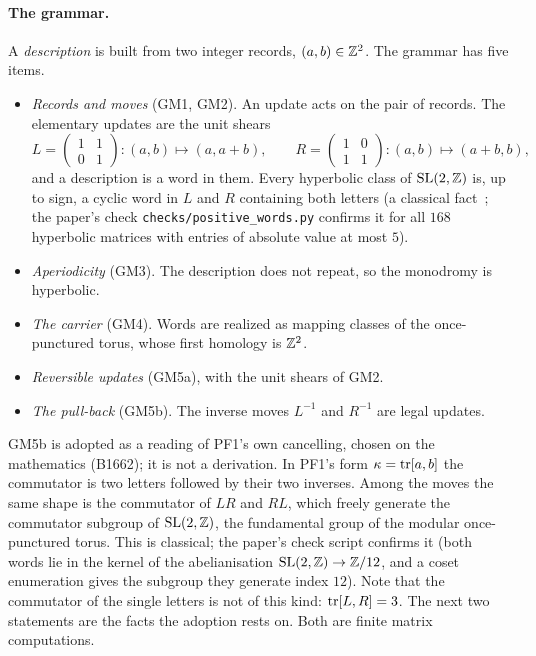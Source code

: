 \paragraph{The grammar.}
A \emph{description} is built from two integer records, $(a,b)\in\mathbb{Z}^2$. The grammar has five items.
\begin{itemize}
\item \emph{Records and moves} (GM1, GM2). An update acts on the pair of records. The elementary updates are the unit
  shears
  \[
    L=\begin{pmatrix}1&1\\0&1\end{pmatrix}:(a,b)\mapsto(a,a+b),\qquad
    R=\begin{pmatrix}1&0\\1&1\end{pmatrix}:(a,b)\mapsto(a+b,b),
  \]
  and a description is a word in them. Every hyperbolic class of $\mathrm{SL}(2,\mathbb{Z})$ is, up to sign, a cyclic word in $L$ and $R$
  containing both letters (a classical fact~\cite{Series1985}; the paper's check \texttt{checks/positive\_words.py} confirms it for all $168$
  hyperbolic matrices with entries of absolute value at most $5$).
\item \emph{Aperiodicity} (GM3). The description does not repeat, so the monodromy is hyperbolic.
\item \emph{The carrier} (GM4). Words are realized as mapping classes of the once-punctured torus, whose first
  homology is $\mathbb{Z}^2$.
\item \emph{Reversible updates} (GM5a), with the unit shears of GM2.
\item \emph{The pull-back} (GM5b). The inverse moves $L^{-1}$ and $R^{-1}$ are legal updates.
\end{itemize}
GM5b is adopted as a reading of PF1's own cancelling, chosen on the mathematics (B1662); it is not a
derivation. In PF1's form $\kappa=\operatorname{tr}[a,b]$ the commutator is two letters followed by their two inverses. Among the
moves the same shape is the commutator of $LR$ and $RL$, which freely generate the commutator subgroup of $\mathrm{SL}(2,\mathbb{Z})$,
the fundamental group of the modular once-punctured torus. This is classical; the paper's check script confirms it
(both words lie in the kernel of the abelianisation $\mathrm{SL}(2,\mathbb{Z})\to\mathbb{Z}/12$, and a coset enumeration gives the subgroup they
generate index $12$).
Note that the commutator of the single letters is not of this kind: $\operatorname{tr}[L,R]=3$. The next two statements are the
facts the adoption rests on. Both are finite matrix computations.

